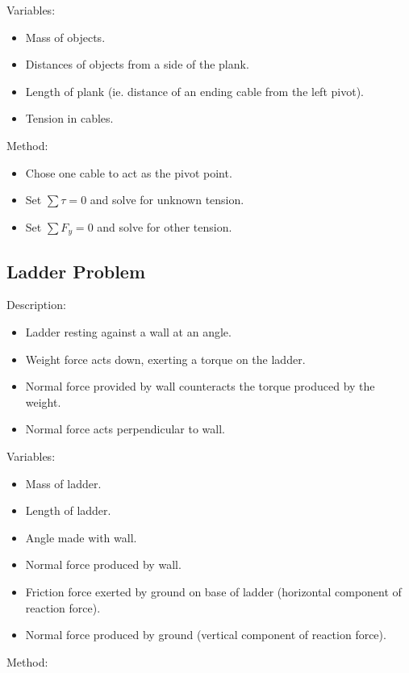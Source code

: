 \documentclass[a4paper,11pt]{article}
\begin{document}
Variables:

\begin{itemize}
\item Mass of objects.
\item Distances of objects from a side of the plank.
\item Length of plank (ie. distance of an ending cable from the left pivot).
\item Tension in cables.
\end{itemize}

Method:

\begin{itemize}
\item Chose one cable to act as the pivot point.
\item Set $\sum \tau = 0$ and solve for unknown tension.
\item Set $\sum F_y = 0$ and solve for other tension.
\end{itemize}


\subsection{Ladder Problem}

Description:

\begin{itemize}
\item Ladder resting against a wall at an angle.
\item Weight force acts down, exerting a torque on the ladder.
\item Normal force provided by wall counteracts the torque produced by the
	weight.
\item Normal force acts perpendicular to wall.
\end{itemize}

Variables:

\begin{itemize}
\item Mass of ladder.
\item Length of ladder.
\item Angle made with wall.
\item Normal force produced by wall.
\item Friction force exerted by ground on base of ladder (horizontal component
	of reaction force).
\item Normal force produced by ground (vertical component of reaction force).
\end{itemize}

Method:
\end{document}
